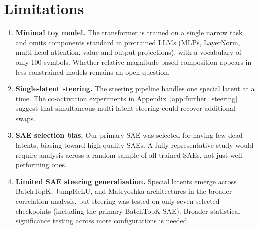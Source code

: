 \section{Limitations}\label{app:limitations}

\begin{enumerate}[label=\Alph*.]
    \item \textbf{Minimal toy model.} The transformer is trained on a single narrow task and omits components standard in pretrained LLMs (MLPs, LayerNorm, multi-head attention, value and output projections), with a vocabulary of only 100 symbols. Whether relative magnitude-based composition appears in less constrained models remains an open question.
    \item \textbf{Single-latent steering.} The steering pipeline handles one special latent at a time. The co-activation experiments in Appendix~\ref{app:further_steering} suggest that simultaneous multi-latent steering could recover additional swaps.
    \item \textbf{SAE selection bias.} Our primary SAE was selected for having few dead latents, biasing toward high-quality SAEs. A fully representative study would require analysis across a random sample of all trained SAEs, not just well-performing ones.
    \item \textbf{Limited SAE steering generalisation.} Special latents emerge across BatchTopK, JumpReLU, and Matryoshka architectures in the broader correlation analysis, but steering was tested on only seven selected checkpoints (including the primary BatchTopK SAE). Broader statistical significance testing across more configurations is needed.
\end{enumerate}
